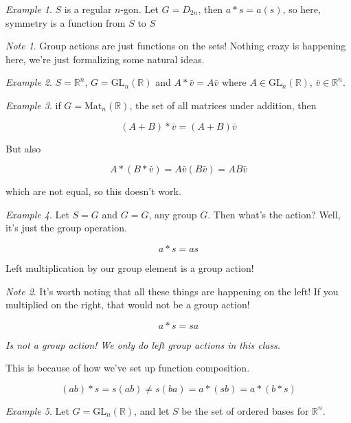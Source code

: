 \documentclass[12pt]{article}
\def\gl{\text{GL}}
\def\R{{\mathbb R}}
\theoremstyle{remark}
\theoremstyle{remark}
\theoremstyle{remark}
\newtheorem{example}{Example}
\theoremstyle{remark}
\theoremstyle{remark}
\newtheorem*{note}{Note}
\begin{document}
\begin{example}
  $S$ is a regular $n$-gon. Let $G = D_{2n}$, then $a * s = a(s)$, so here,
  symmetry is a function from $S$ to $S$
\end{example}

\begin{note}
  Group actions are just functions on the sets! Nothing crazy is happening
  here, we're just formalizing some natural ideas.
\end{note}

\begin{example}
  $S = \R^n$, $G = \gl_n(\R)$ and $A * \bar v = A \bar v$ where $A \in
  \gl_n(\R)$, $\bar v \in \R^n$.
\end{example}

\begin{example}
  if $G = \text{Mat}_n(\R)$, the set of all matrices under addition, then

  \[
    (A + B) * \bar v = (A + B)\bar v
  \]

  But also

  \[
    A * (B * \bar v) = A \bar v (B \bar v) = AB\bar v
  \]

  which are not equal, so this doesn't work.
\end{example}

\begin{example}
  Let $S = G$ and $G = G$, any group $G$. Then what's the action? Well, it's
  just the group operation.

  \[
    a * s = as
  \]

  Left multiplication by our group element is a group action!
\end{example}

\begin{note}
  It's worth noting that all these things are happening on the left! If you
  multiplied on the right, that would not be a group action!

  \[
    a * s = sa
  \]

  {\it Is not a group action! We only do left group actions in this class.}

  This is because of how we've set up function composition.

  \[
    (ab) * s = s(ab) \ne s (ba) = a * (sb) = a * (b * s)
  \]
\end{note}

\begin{example}
  Let $G = \gl_n(\R)$, and let $S$ be the set of ordered bases for $\R^n$.
\end{example}
\end{document}
